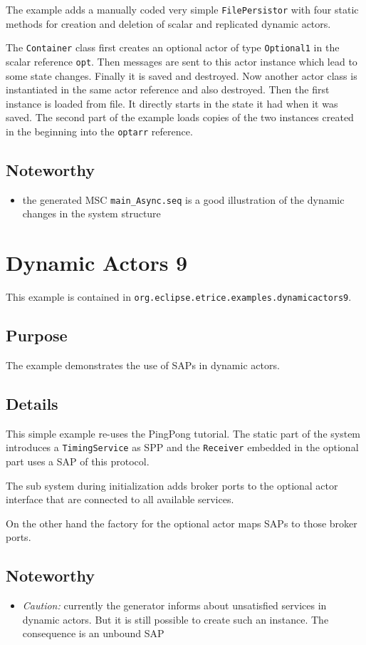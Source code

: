 The example adds a manually coded very simple \texttt{FilePersistor} with four static methods for creation and deletion of scalar and replicated
dynamic actors.

The \texttt{Container} class first creates an optional actor of type \texttt{Optional1} in the scalar reference \texttt{opt}.
Then messages are sent to this actor instance which lead to some state changes. Finally it is saved and destroyed.
Now another actor class is instantiated in the same actor reference and also destroyed. Then the first instance is loaded from file.
It directly starts in the state it had when it was saved. The second part of the example loads copies of the two
instances created in the beginning into the \texttt{optarr} reference.

\subsection{Noteworthy}

\begin{itemize}
\item the generated MSC \texttt{main\_Async.seq} is a good illustration of the dynamic changes in the system structure
\end{itemize}

\section{Dynamic Actors 9}

This example is contained in \texttt{org.eclipse.etrice.examples.dynamicactors9}.

\subsection{Purpose}

The example demonstrates the use of SAPs in dynamic actors.

\subsection{Details}

This simple example re-uses the PingPong tutorial. The static part of the system introduces a \texttt{TimingService} as SPP
and the \texttt{Receiver} embedded in the optional part uses a SAP of this protocol.

The sub system during initialization adds broker ports to the optional actor interface that are connected to all available
services.

On the other hand the factory for the optional actor maps SAPs to those broker ports.

\subsection{Noteworthy}

\begin{itemize}
\item \emph{Caution:} currently the generator informs about unsatisfied services in dynamic actors. But it is still possible to create such an
instance. The consequence is an unbound SAP
\end{itemize}
